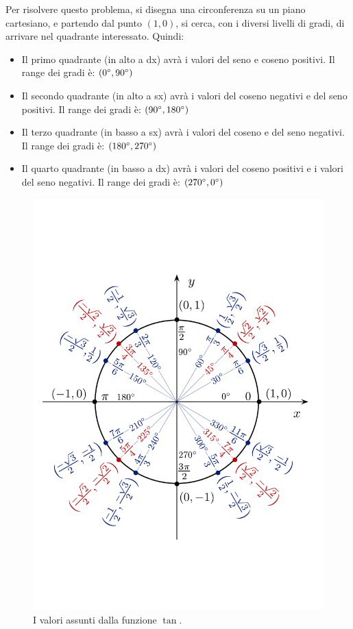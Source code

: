 \documentclass[a4paper]{article}
\begin{document}
	Per risolvere questo problema, si disegna una circonferenza su un piano cartesiano, e partendo dal punto $\left(1,0\right)$, si cerca, con i diversi livelli di gradi, di arrivare nel quadrante interessato. Quindi:
	\begin{itemize}
		\item Il primo quadrante (in alto a dx) avrà i valori del seno e coseno positivi. Il range dei gradi è: $\left(0\degree,90\degree\right)$
		\item Il secondo quadrante (in alto a sx) avrà i valori del coseno negativi e del seno positivi. Il range dei gradi è: $\left(90\degree, 180\degree\right)$
		\item Il terzo quadrante (in basso a sx) avrà i valori del coseno e del seno negativi. Il range dei gradi è: $\left(180\degree, 270\degree\right)$
		\item Il quarto quadrante (in basso a dx) avrà i valori del coseno positivi e i valori del seno negativi. Il range dei gradi è: $\left(270\degree, 0\degree\right)$
	\end{itemize}\newpage
	\begin{figure}[!htp]
		\centering
		\includegraphics[width=.7\textwidth]{img/trigonometria_tan.pdf}
		\caption{I valori assunti dalla funzione $\tan$.}
		\label{fig: funzione tan}
	\end{figure}
	
\end{document}
